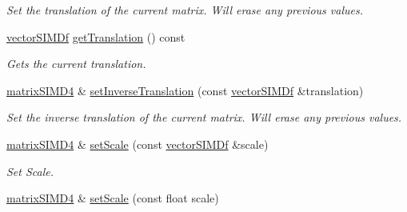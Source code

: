 \begin{DoxyCompactItemize}
\begin{DoxyCompactList}\small\item\em Set the translation of the current matrix. Will erase any previous values. \end{DoxyCompactList}\item 
\hyperlink{classirr_1_1core_1_1vectorSIMDf}{vector\+S\+I\+M\+Df} \hyperlink{classirr_1_1core_1_1matrixSIMD4_a0e0da796355a006a2d1666fe8700d68d}{get\+Translation} () const \hypertarget{classirr_1_1core_1_1matrixSIMD4_a0e0da796355a006a2d1666fe8700d68d}{}\label{classirr_1_1core_1_1matrixSIMD4_a0e0da796355a006a2d1666fe8700d68d}

\begin{DoxyCompactList}\small\item\em Gets the current translation. \end{DoxyCompactList}\item 
\hyperlink{classirr_1_1core_1_1matrixSIMD4}{matrix\+S\+I\+M\+D4} \& \hyperlink{classirr_1_1core_1_1matrixSIMD4_ac69334867ec8b557be4ee407675dac54}{set\+Inverse\+Translation} (const \hyperlink{classirr_1_1core_1_1vectorSIMDf}{vector\+S\+I\+M\+Df} \&translation)\hypertarget{classirr_1_1core_1_1matrixSIMD4_ac69334867ec8b557be4ee407675dac54}{}\label{classirr_1_1core_1_1matrixSIMD4_ac69334867ec8b557be4ee407675dac54}

\begin{DoxyCompactList}\small\item\em Set the inverse translation of the current matrix. Will erase any previous values. \end{DoxyCompactList}\item 
\hyperlink{classirr_1_1core_1_1matrixSIMD4}{matrix\+S\+I\+M\+D4} \& \hyperlink{classirr_1_1core_1_1matrixSIMD4_ab14646ef7e2b931dfb751cd25398fc32}{set\+Scale} (const \hyperlink{classirr_1_1core_1_1vectorSIMDf}{vector\+S\+I\+M\+Df} \&scale)\hypertarget{classirr_1_1core_1_1matrixSIMD4_ab14646ef7e2b931dfb751cd25398fc32}{}\label{classirr_1_1core_1_1matrixSIMD4_ab14646ef7e2b931dfb751cd25398fc32}

\begin{DoxyCompactList}\small\item\em Set Scale. \end{DoxyCompactList}\item 
\hyperlink{classirr_1_1core_1_1matrixSIMD4}{matrix\+S\+I\+M\+D4} \& \hyperlink{classirr_1_1core_1_1matrixSIMD4_ace3643029026ae72f4c49899b1eb9263}{set\+Scale} (const float scale)\hypertarget{classirr_1_1core_1_1matrixSIMD4_ace3643029026ae72f4c49899b1eb9263}{}\label{classirr_1_1core_1_1matrixSIMD4_ace3643029026ae72f4c49899b1eb9263}


\end{DoxyCompactItemize}
